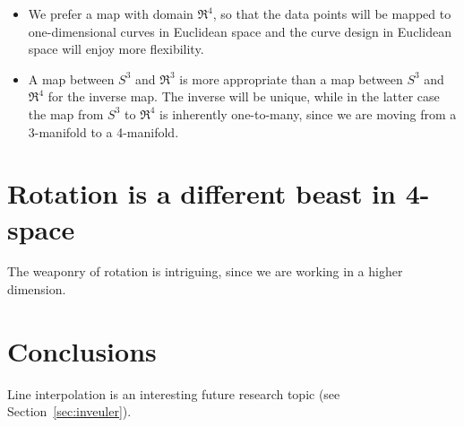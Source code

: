 \documentclass[11pt]{article}
\begin{document}
\begin{itemize}
\item
We prefer a map with domain $\Re^4$, so that the data points will be
mapped to one-dimensional curves in Euclidean space and the 
curve design in Euclidean space will enjoy more flexibility.
\item
A map between $S^3$ and $\Re^3$ is more appropriate than a map between $S^3$ and $\Re^4$
for the inverse map.
The inverse will be unique, while in the latter case the map from $S^3$ to $\Re^4$ is
inherently one-to-many, since we are moving from a 3-manifold to a 4-manifold.
\end{itemize}

\section{Rotation is a different beast in 4-space}

The weaponry of rotation is intriguing, since we are working in a higher dimension.

\section{Conclusions}

Line interpolation is an interesting future research topic 
(see Section~\ref{sec:inveuler}).

\clearpage
\end{document}
